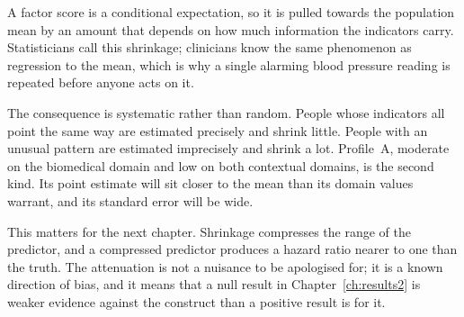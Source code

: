 \begin{reading}
A factor score is a conditional expectation, so it is pulled towards the
population mean by an amount that depends on how much information the
indicators carry. Statisticians call this shrinkage; clinicians know the same
phenomenon as regression to the mean, which is why a single alarming blood
pressure reading is repeated before anyone acts on it.

The consequence is systematic rather than random. People whose indicators all
point the same way are estimated precisely and shrink little. People with an
unusual pattern are estimated imprecisely and shrink a lot. Profile~A,
moderate on the biomedical domain and low on both contextual domains, is the
second kind. Its point estimate will sit closer to the mean than its domain
values warrant, and its standard error will be wide.

This matters for the next chapter. Shrinkage compresses the range of the
predictor, and a compressed predictor produces a hazard ratio nearer to one
than the truth. The attenuation is not a nuisance to be apologised for; it is a
known direction of bias, and it means that a null result in
Chapter~\ref{ch:results2} is weaker evidence against the construct than a
positive result is for it.
\end{reading}


